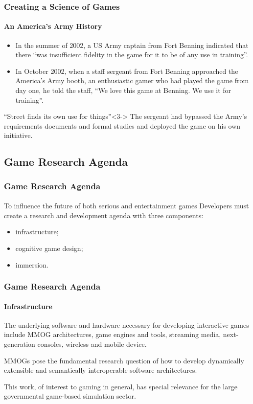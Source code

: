 \begin{frame}
\frametitle{Creating a Science of Games}
\framesubtitle{An America's Army History}
\begin{itemize}
\item <1->
In the summer of 2002, a US Army captain from Fort Benning indicated that there
``was insufficient fidelity in the game for it to be of any use in training''.
\item <2->
In October 2002, when a staff sergeant from Fort Benning approached the
America's Army booth, an enthusiastic gamer who had played the game from
day one, he told the staff, ``We love this game at Benning. We use it for
training''.
\end{itemize}

\begin{block}{``Street finds its own use for things''}<3->
The sergeant had bypassed the Army's requirements documents and formal studies
and deployed the game on his own initiative.
\end{block}
\end{frame}


\subsection{Game Research Agenda}

\begin{frame}
\frametitle{Game Research Agenda}
\framesubtitle{}
\begin{block}{
To influence the future of both serious and entertainment games}
Developers must create a research and development agenda with three components:
\begin{itemize}
\item <2->
infrastructure;
\item <3->
cognitive game design;
\item <4->
immersion.
\end{itemize}
\end{block}
\end{frame}

\begin{frame}
\frametitle{Game Research Agenda}
\framesubtitle{Infrastructure}
The underlying software and hardware necessary for developing interactive
games include \alert{MMOG architectures}, game engines and tools,
streaming media, next-generation consoles, wireless and mobile device.
\pause
\begin{block}{}
MMOGs pose the fundamental research
question of how to develop dynamically extensible
and semantically interoperable software architectures.
\end{block}
\pause
\vfill
This work, of interest to gaming in general, has special relevance for the
large governmental game-based simulation sector.
\end{frame}

